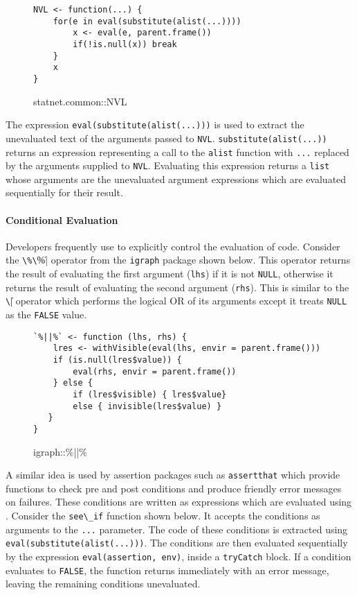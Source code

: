\documentclass[screen,acmsmall]{acmart}%
\newcommand{\code}[1]{\lstinline |#1|\xspace}
\begin{document}
\begin{figure}[h]
\begin{lstlisting}
NVL <- function(...) {
    for(e in eval(substitute(alist(...))))
        x <- eval(e, parent.frame())
        if(!is.null(x)) break
    }
    x
}
\end{lstlisting}
  \caption{statnet.common::NVL}
\end{figure}

The expression \code{eval(substitute(alist(...)))} is used to extract the
unevaluated text of the arguments passed to \code{NVL}.
\code{substitute(alist(...))} returns an expression representing a call to the
\code{alist} function with \code{...} replaced by the arguments supplied to
\code{NVL}. Evaluating this expression returns a \code{list} whose arguments are
the unevaluated argument expressions which are evaluated sequentially for their
result.

\paragraph{Conditional Evaluation} Developers frequently use \eval to explicitly
control the evaluation of code. Consider the \code{\%\|\|\%} operator from the
\code{igraph} package shown below. This operator returns the result of
evaluating the first argument (\code{lhs}) if it is not \code{NULL}, otherwise
it returns the result of evaluating the second argument (\code{rhs}). This is
similar to the \code{\|\|} operator which performs the logical OR of its
arguments except it treats \code{NULL} as the \code{FALSE} value.

\begin{figure}[h]
\begin{lstlisting}
`%||%` <- function (lhs, rhs) {
    lres <- withVisible(eval(lhs, envir = parent.frame()))
    if (is.null(lres$value)) {
        eval(rhs, envir = parent.frame())
    } else {
        if (lres$visible) { lres$value}
        else { invisible(lres$value) }
   }
}
\end{lstlisting}
  \caption{igraph::\%||\%}
\end{figure}

A similar idea is used by assertion packages such as \code{assertthat} which
provide functions to check pre and post conditions and produce friendly error
messages on failures. These conditions are written as expressions which are
evaluated using \eval. Consider the \code{see\_if} function shown below. It
accepts the conditions as arguments to the \code{...} parameter. The code of
these conditions is extracted using \code{eval(substitute(alist(...)))}. The
conditions are then evaluated sequentially by the expression
\code{eval(assertion, env)}, inside a \code{tryCatch} block. If a condition
evaluates to \code{FALSE}, the function returns immediately with an error
message, leaving the remaining conditions unevaluated.
\end{document}
